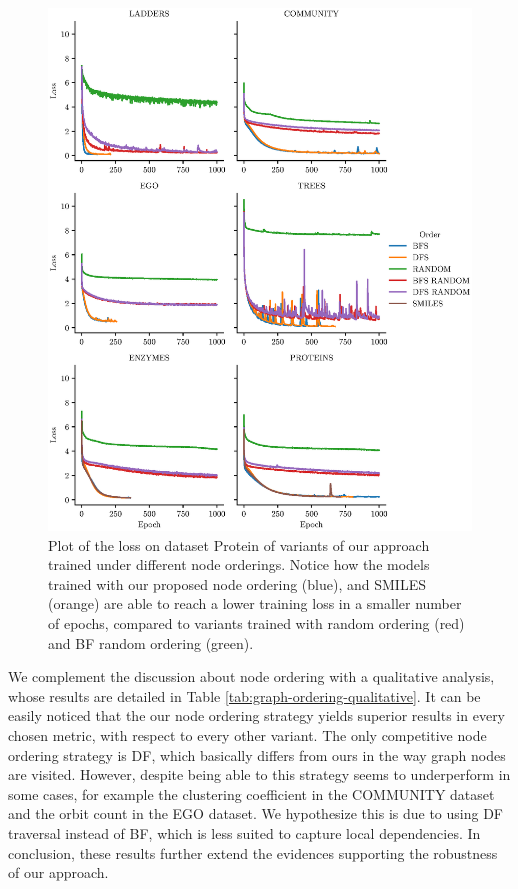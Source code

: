 \begin{figure}[h!]
\centering
\includegraphics[width=\textwidth]{Figures/Chapter6/loss.eps}
\caption{Plot of the loss on dataset Protein of variants of our approach trained under different node orderings. Notice how the models trained with our proposed node ordering (blue), and SMILES (orange) are able to reach a lower training loss in a smaller number of epochs, compared to variants trained with random ordering (red) and BF random ordering (green).}
\label{fig:loss}
\end{figure}
We complement the discussion about node ordering with a qualitative analysis, whose results are detailed in Table \ref{tab:graph-ordering-qualitative}. It can be easily noticed that the our node ordering strategy yields superior results in every chosen metric, with respect to every other variant. The only competitive node ordering strategy is DF, which basically differs from ours in the way graph nodes are visited. However, despite being able to this strategy seems to underperform in some cases, for example the clustering coefficient in the COMMUNITY dataset and the orbit count in the EGO dataset. We hypothesize this is due to using DF traversal instead of BF, which is less suited to capture local dependencies. In conclusion, these results further extend the evidences supporting the robustness of our approach.
\begin{landscape}

\end{landscape}


